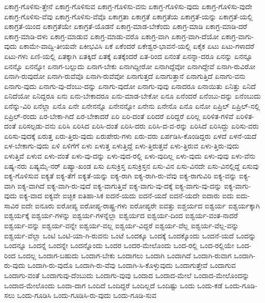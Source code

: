 {ಏಕಾಗ್ರ-ಗೊಳಿಸು-ತ್ತೇನೆ
ಏಕಾಗ್ರ-ಗೊಳಿಸುವ
ಏಕಾಗ್ರ-ಗೊಳಿಸು-ವನು
ಏಕಾಗ್ರ-ಗೊಳಿಸು-ವುದು
ಏಕಾಗ್ರ-ಗೊಳಿಸು-ವುದೇ
ಏಕಾಗ್ರ-ಗೊಳಿಸು-ವೆವು
ಏಕಾಗ್ರ-ಗೊಳಿಸು-ವೆವೊ
ಏಕಾಗ್ರತಾ
ಏಕಾಗ್ರತೆ
ಏಕಾಗ್ರತೆಯ
ಏಕಾಗ್ರತೆ-ಯನ್ನು
ಏಕಾಗ್ರತೆ-ಯಲ್ಲಿ
ಏಕಾಗ್ರತೆ-ಯಿಂದ
ಏಕಾಗ್ರತೆಯೇ
ಏಕಾಗ್ರತೆ-ಯೊಡನೆ
ಏಕಾಗ್ರ-ಮಾಡ-ಬೇಕೆಂದು
ಏಕಾಗ್ರ-ಮಾಡಿ
ಏಕಾಗ್ರ-ಮಾಡಿ-ದರೆ
ಏಕಾಗ್ರ-ಮಾಡಿ-ದಳು
ಏಕಾಗ್ರ-ಮಾಡುವ
ಏಕಾಗ್ರ-ಮಾಡು-ವರೊ
ಏಕಾಗ್ರ-ವಾಗಿ
ಏಕಾಗ್ರ-ವಾಗಿ-ದೆಯೋ
ಏಕಾಗ್ರ-ವಾಗು-ವುದು
ಏಕಾಮೇ-ವಾದ್ವಿ-ತೀಯವೇ
ಏಕೀಭವಿಸಿ
ಏಕೆ
ಏಕೆಂದರೆ
ಏಕೇಶ್ವರ-ಭಾವನೆ-ಯಲ್ಲಿ
ಏಕೈಕ
ಏಟು
ಏಟು-ಗಳಾದರೆ
ಏಟು-ಗಳು
ಏಣಿ-ಯಲ್ಲಿ
ಏತಕ್ಕಾಗಿ
ಏತಕ್ಕಿದೆ
ಏತಕ್ಕೆ
ಏತಕ್ಕೆಂದರೆ
ಏತ-ರಿಂದ
ಏನಂತೆ
ಏನನ್ನಾ-ದರೂ
ಏನನ್ನು
ಏನನ್ನೂ
ಏನನ್ನೊ
ಏನನ್ನೋ
ಏನಾಗ-ಬಲ್ಲುದು
ಏನಾಗ-ಬೇಕು
ಏನಾಗಿದ್ದೀರೋ
ಏನಾಗಿದ್ದೆವೋ
ಏನಾಗಿದ್ದೇವೆ
ಏನಾಗಿ-ರುವಿರೋ
ಏನಾಗಿ-ರುವುದೋ
ಏನಾಗಿ-ರುವೆವೊ
ಏನಾಗಿ-ರುವೆವೋ
ಏನಾಗುತ್ತದೆ
ಏನಾಗುತ್ತಾನೆ
ಏನಾಗುತ್ತಿದೆ
ಏನಾಗು-ವನು
ಏನಾಗು-ವುದು
ಏನಾಗು-ವು-ದೆಂಬು-ದನ್ನು
ಏನಾಗು-ವುದೋ
ಏನಾಗು-ವುವು
ಏನಾದರೂ
ಏನಾಯಿತು
ಏನಿತ್ತು
ಏನಿದೆ
ಏನಿದೆಯೋ
ಏನಿದ್ದರೂ
ಏನು
ಏನು-ಬೇಕಾದರೂ
ಏನು-ಮಾಡ-ಬೇಕೋ
ಏನೂ
ಏನೆಂದರೆ
ಏನೆಂಬು-ದನ್ನು
ಏನೆಂಬುದು
ಏನೆನ್ನು-ವಿರಿ
ಏನೆಲ್ಲಾ
ಏನೊ
ಏನೇ
ಏನೇನನ್ನೊ
ಏನೇನನ್ನೋ
ಏನೇನು
ಏನೇನೊ
ಏನೊ
ಏನೋ
ಏಪ್ರಿಲ್
ಏಪ್ರಿಲ್-ನಲ್ಲಿ
ಏಪ್ರಿಲ್-ರಂದು
ಏರ-ಬೇಕಾ-ಗಿದೆ
ಏರ-ಬೇಕಾದರೆ
ಏರಿ
ಏರಿ-ದಂತೆ
ಏರಿದರೆ
ಏರಿದ್ದರೆ
ಏರಿಲ್ಲ
ಏರಿಳಿತ-ಗಳಿವೆ
ಏರಿಳಿತ-ದಂತೆ
ಏರಿಸಲ್ಪಡು-ವನು
ಏರಿಸಿ
ಏರಿಸಿದ
ಏರಿಸಿ-ದಂತೆ
ಏರಿಸಿ-ದರು
ಏರಿಸಿ-ದ-ವ-ರನ್ನು
ಏರಿಸಿದೆ
ಏರಿಸಿದ್ದು
ಏರಿಸು-ವರು
ಏರಿಸು-ವುದಕ್ಕೆ
ಏರುತ್ತ
ಏರು-ತ್ತಿರು-ವುದು
ಏರುಪೇರು-ಗಳು
ಏರು-ವರು
ಏರ್ಪಡಿಸಿ-ಕೊಂಡಿದ್ದರು
ಏಳದೆ
ಏಳನೆ-ಯದೆ
ಏಳ-ಬೇಕಾಗು-ವುದು
ಏಳಿ
ಏಳಿಗೆಗೆ
ಏಳು
ಏಳುತ್ತ
ಏಳುತ್ತಿದ್ದೆ
ಏಳು-ತ್ತಿರುತ್ತವೆ
ಏಳು-ತ್ತಿರುವ
ಏಳು-ತ್ತಿರು-ವುದು
ಏಳುತ್ತಿವೆ
ಏಳುವ
ಏಳು-ವಂತೆ
ಏಳು-ವು-ದನ್ನು
ಏಳು-ವುದ-ರಲ್ಲಿ
ಏಳು-ವುದಿಲ್ಲ
ಏಳು-ವುದು
ಏಳು-ವುವು
ಏಳು-ವೆನು
ಏಷ್ಯ-ನರು
ಏಷ್ಯಮೈ-ನರ್
ಏಷ್ಯಾ-ಖಂಡ
ಏಸು
ಏಸುಕ್ರಿಸ್ತ
ಏಸುಕ್ರಿಸ್ತನ
ಏಸು-ವಿನ
ಏಸು-ವಿನದೇ
ಏಸು-ವಿನಲ್ಲಿದ್ದೆ
ಏಸುವು
ಐಕ್ಯ-ಗೊಳಿಸುವ
ಐಕ್ಯತೆ
ಐಕ್ಯ-ತೆಗೆ
ಐಕ್ಯತೆ-ಯನ್ನು
ಐಕ್ಯ-ರಾಗಿ
ಐಕ್ಯ-ರಾಗಿ-ರು-ವೆವು
ಐಕ್ಯ-ರಾಗುವಿರಿ
ಐಕ್ಯ-ವನ್ನು
ಐಕ್ಯ-ವಾಗಿ
ಐಕ್ಯ-ವಾಗಿದೆ
ಐಕ್ಯ-ವಾಗಿ-ರು-ವುದೆ
ಐಕ್ಯ-ವಾಗುತ್ತಿವೆ
ಐಕ್ಯ-ವಾಗು-ವು-ದಕ್ಕೆ
ಐಕ್ಯ-ವಾಗು-ವು-ದನ್ನು
ಐಕ್ಯ-ವಾಗು-ವುದು
ಐಕ್ಯ-ವಾದ
ಐಕ್ಯವೇ
ಐಚ್ಛಿಕ
ಐತಿಹಾ-ಸಿಕ
ಐದನೆ-ಯದು
ಐದನೆ-ಯದೆ
ಐದನೆ-ಯದೇ
ಐದಾರು
ಐದು
ಐದು-ಸಾವಿರ
ಐದೇ
ಐನೂರು
ಐರೋಪ್ಯ
ಐರೋಪ್ಯ-ರಾಷ್ಟ್ರ-ಗಳು
ಐರೋಪ್ಯರೇ
ಐವತ್ತು
ಐಶ್ಚರ್ಯದ
ಐಶ್ವರ್ಯ
ಐಶ್ವರ್ಯಕ್ಕಾಗಿ
ಐಶ್ವರ್ಯಕ್ಕೆ
ಐಶ್ವರ್ಯ-ಗಳನ್ನು
ಐಶ್ವರ್ಯ-ಗಳನ್ನೆಲ್ಲಾ
ಐಶ್ವರ್ಯದ
ಐಶ್ವರ್ಯ-ದಿಂದ
ಐಶ್ವರ್ಯ-ವಂತ-ನಾದರೆ
ಐಶ್ವರ್ಯ-ವನ್ನು
ಐಶ್ವರ್ಯ-ವನ್ನೇ
ಐಶ್ವರ್ಯ-ವಲ್ಲ
ಐಶ್ವರ್ಯ-ವಿದ್ದರೆ
ಐಶ್ವರ್ಯ-ವೆಲ್ಲ
ಐಶ್ವರ್ಯ-ವೆಲ್ಲ-ವನ್ನು
ಐಶ್ವರ್ಯ-ವೆಲ್ಲಾ
ಒಂಟಿ
ಒಂಟಿ-ಯಾ-ಗಿ-ರುವನು
ಒಂಟೆ
ಒಂದಕ್ಕೂ
ಒಂದಕ್ಕೆ
ಒಂದಕ್ಕೊಂದು
ಒಂದನೆ-ಯದೆ
ಒಂದನ್ನು
ಒಂದನ್ನೂ
ಒಂದನ್ನೆ
ಒಂದನ್ನೇ
ಒಂದನ್ನೊಂದು
ಒಂದರ
ಒಂದರ-ಮೇಲೊಂದು
ಒಂದ-ರಲ್ಲಿ
ಒಂದ-ರಲ್ಲಿಯೇ
ಒಂದ-ರಿಂದ
ಒಂದಲ್ಲ
ಒಂದಾಗ-ಬಹುದು
ಒಂದಾಗ-ಬೇಕು
ಒಂದಾಗಲು
ಒಂದಾಗಿ
ಒಂದಾಗಿದೆ
ಒಂದಾಗಿ-ರುವಾಗ
ಒಂದಾಗಿ-ರು-ವುದು
ಒಂದಾಗಿ-ರು-ವುದೊ
ಒಂದಾಗಿ-ರು-ವೆವು
ಒಂದಾಗಿ-ಸಿ-ಕೊಳ್ಳುವುದು
ಒಂದಾಗುತ್ತೇವೆ
ಒಂದಾಗುವ
ಒಂದಾಗು-ವಂತೆ
ಒಂದಾಗುವು-ದೆಂಬುದು
ಒಂದಾಗು-ವುವು
ಒಂದಾದ
ಒಂದಾದ-ಮೇಲೆ
ಒಂದಾದ-ಮೇಲೊಂದನ್ನು
ಒಂದಾದ-ಮೇಲೊಂದು
ಒಂದಾ-ದಾಗ
ಒಂದಿದೆ
ಒಂದಿದ್ದರೆ
ಒಂದಿಲ್ಲದೆ
ಒಂದಿಷ್ಟು
ಒಂದು
ಒಂದು-ಕಡೆ
ಒಂದು-ಗೂಡಿ-ಸಲು
ಒಂದು-ಗೂಡಿಸಿ
ಒಂದು-ಗೂಡಿಸಿ-ರು-ವುದು
ಒಂದು-ಗೂಡಿ-ಸುವ
}
